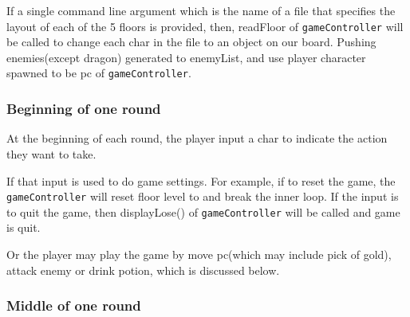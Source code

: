 \documentclass[11pt]{article}
\theoremstyle{plain} \newtheorem{theorem*}{Theorem}[subsection]
\begin{document}
\begin{enumerate}[leftmargin=*]
\begin{enumerate}[leftmargin=*, noitemsep, label=(\roman*)]
\end{enumerate}

If a single command line argument which is the name of a file that specifies
the layout of each of the 5 floors is provided, then, \textsf{readFloor} of
\texttt{gameController} will be called to change each char in the file to an
object on our board. 
Pushing enemies(except dragon) generated to \textsf{enemyList}, and 
use player character spawned to be \textsf{pc} of \texttt{gameController}.

\end{enumerate}



\subsubsection{ Beginning of one round }

At the beginning of each round, the player input a char to indicate the 
action they want to take. 

If that input is used to do game settings. For example, if to reset the game,
the \texttt{gameController} will reset floor level to and break the inner
loop. If the input is to quit the game, then \textsf{displayLose()} of
\texttt{gameController} will be called and game is quit.

Or the player may play the game by move pc(which may include pick of gold),
attack enemy or drink potion, which is discussed below.


\subsubsection{Middle of one round}
\end{document}
